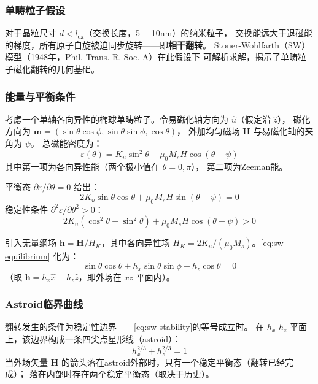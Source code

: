 \documentclass[11pt,a4paper,twoside]{article}
\theoremstyle{definition}
\theoremstyle{plain}
\theoremstyle{remark}
\begin{document}
\subsubsection{单畴粒子假设}

对于晶粒尺寸 $d < l_{\text{ex}}$（交换长度，\SI{5}{-10}{nm}）的纳米粒子，
交换能远大于退磁能的梯度，所有原子自旋被迫同步旋转——即\textbf{相干翻转}。
Stoner-Wohlfarth（SW）模型（1948年，Phil. Trans. R. Soc. A）在此假设下
可解析求解，揭示了单畴粒子磁化翻转的几何基础。

\subsubsection{能量与平衡条件}

考虑一个单轴各向异性的椭球单畴粒子。令易磁化轴方向为 $\hat{u}$（假定沿 $\hat{z}$），
磁化方向为 $\mathbf{m} = (\sin\theta\cos\phi, \sin\theta\sin\phi, \cos\theta)$，
外加均匀磁场 $\mathbf{H}$ 与易磁化轴的夹角为 $\psi$。
总磁能密度为：
\begin{equation}\label{eq:sw-energy}
  \varepsilon(\theta) = K_u \sin^2\theta - \mu_0 M_s H \cos(\theta - \psi)
\end{equation}
其中第一项为各向异性能（两个极小值在 $\theta = 0, \pi$），
第二项为Zeeman能。

平衡态 $\partial\varepsilon/\partial\theta = 0$ 给出：
\begin{equation}\label{eq:sw-equilibrium}
  2K_u \sin\theta \cos\theta + \mu_0 M_s H \sin(\theta - \psi) = 0
\end{equation}
稳定性条件 $\partial^2\varepsilon/\partial\theta^2 > 0$：
\begin{equation}\label{eq:sw-stability}
  2K_u (\cos^2\theta - \sin^2\theta) + \mu_0 M_s H \cos(\theta - \psi) > 0
\end{equation}

引入无量纲场 $\mathbf{h} = \mathbf{H} / H_K$，其中各向异性场
$H_K = 2K_u / (\mu_0 M_s)$。\cref{eq:sw-equilibrium} 化为：
\begin{equation}
  \sin\theta \cos\theta + h_x \sin\theta \sin\phi - h_z \cos\theta = 0
\end{equation}
（取 $\mathbf{h} = h_x \hat{x} + h_z \hat{z}$，即外场在 $xz$ 平面内）。

\subsubsection{Astroid临界曲线}

翻转发生的条件为稳定性边界——\cref{eq:sw-stability}的等号成立时。
在 $h_x$-$h_z$ 平面上，该边界构成一条四尖点星形线（astroid）：
\begin{equation}\label{eq:astroid}
  \boxed{ h_x^{2/3} + h_z^{2/3} = 1 }
\end{equation}
当外场矢量 $\mathbf{H}$ 的箭头落在astroid外部时，只有一个稳定平衡态（翻转已经完成）；
落在内部时存在两个稳定平衡态（取决于历史）。
\end{document}
